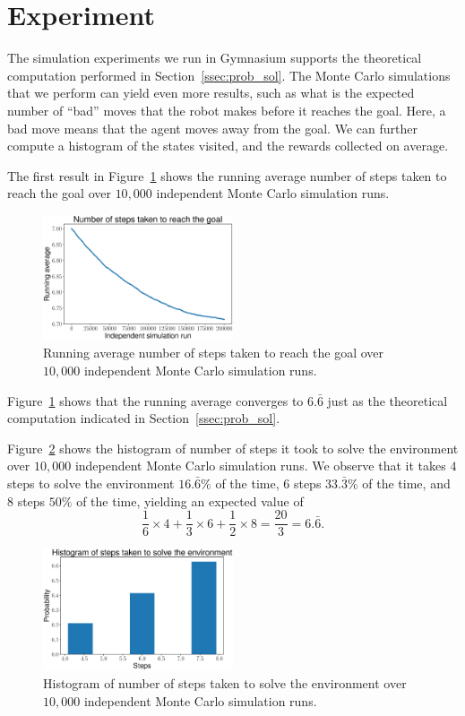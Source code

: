 \section{Experiment}
\label{sec:experiment}
%
The simulation experiments we run in Gymnasium supports the theoretical
computation performed in Section~\ref{ssec:prob_sol}. The Monte Carlo
simulations that we perform can yield even more results, such as what is the 
expected number of ``bad'' moves that the robot makes before it reaches the goal. Here, a bad move means that the agent moves away from the goal. We can 
further compute a histogram of the states visited, and the rewards collected on 
average.

The first result in Figure~\ref{fig:running_avg} shows the running average
number of steps taken to reach the goal over $10,000$ independent Monte Carlo
simulation runs.
%
\begin{figure}[t]
    \centering
    \includegraphics[width=0.5\textwidth]{./figures/running_avg.eps}
    \caption{Running average number of steps taken to reach the goal over $10,000$ independent Monte Carlo simulation runs.}
    \label{fig:running_avg}
\end{figure}
%
Figure~\ref{fig:running_avg} shows that the running average converges to $6.\bar{6}$ just as the theoretical computation indicated in Section~\ref{ssec:prob_sol}.

Figure~\ref{fig:histogram} shows the histogram of number of steps it took to 
solve the environment over $10,000$ independent Monte Carlo simulation runs. We 
observe that it takes $4$ steps to solve the environment $16.\bar{6}\%$ of the time, $6$ steps $33.\bar{3}\%$ of the time, and $8$ steps $50\%$ of the time, yielding an expected value of 
%
\[
\frac{1}{6} \times 4 + \frac{1}{3} \times 6 + \frac{1}{2} \times 8 = \frac{20}{3} = 6.\bar{6}.
\]
%
\begin{figure}[tbh]
    \centering
    \includegraphics[width=0.5\textwidth]{./figures/steps_histogram.eps}
    \caption{Histogram of number of steps taken to solve the environment over $10,000$ independent Monte Carlo simulation runs.}
    \label{fig:histogram}
\end{figure}

